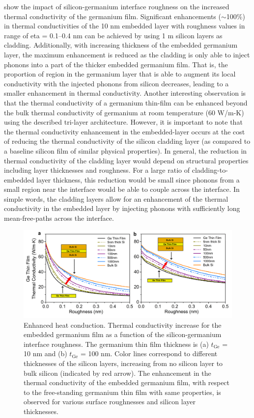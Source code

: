 \par {} show the impact of silicon-germanium interface roughness on the increased thermal conductivity of the germanium film. Significant enhancements ($\sim$100\%) in thermal conductivities of the 10 nm embedded layer with roughness values in range of \gls{eta} = 0.1–0.4 nm can be achieved by using 1 \si{\micro}m silicon layers as cladding. Additionally, with increasing thickness of the embedded germanium layer, the maximum enhancement is reduced as the cladding is only able to inject phonons into a part of the thicker embedded germanium film. That is, the proportion of region in the germanium layer that is able to augment its local conductivity with the injected phonons from silicon decreases, leading to a smaller enhancement in thermal conductivity. Another interesting observation is that the thermal conductivity of a germanium thin-film can be enhanced beyond the bulk thermal conductivity of germanium at room temperature (60 W/m-K) using the described tri-layer architecture. However, it is important to note that the thermal conductivity enhancement in the embedded-layer occurs at the cost of reducing the thermal conductivity of the silicon cladding layer (as compared to a baseline silicon film of similar physical properties). In general, the reduction in thermal conductivity of the cladding layer would depend on structural properties including layer thicknesses and roughness. For a large ratio of cladding-to-embedded layer thickness, this reduction would be small since phonons from a small region near the interface would be able to couple across the interface. In simple words, the cladding layers allow for an enhancement of the thermal conductivity in the embedded layer by injecting phonons with sufficiently long mean-free-paths across the interface. 
\begin{figure}[hbt]
  \centering \includegraphics[width=1.0\textwidth]{figures/ch5/Fig2-enh.jpg}
  \caption{Enhanced heat conduction. Thermal conductivity increase for the embedded germanium film as a function of the silicon-germanium interface roughness. The germanium thin film thickness is (a) $t_{\text{Ge}}$ = 10 nm and (b) $t_{\text{Ge}}$ = 100 nm. Color lines correspond to different thicknesses of the silicon layers, increasing from no silicon layer to bulk silicon (indicated by red arrow). The enhancement in the thermal conductivity of the embedded germanium film, with respect to the free-standing germanium thin film with same properties, is observed for various surface roughnesses and silicon layer thicknesses.}
  \label{fig:ch5-enh2}
\end{figure}
